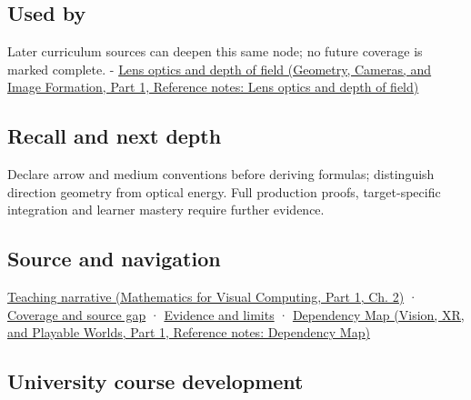 \subsection{Used by}\label{appendix-44e00863b4d5-used-by}

\hypertarget{appendix-44e00863b4d5-used-by}{}

Later curriculum sources can deepen this same node; no future coverage is marked complete. - \href{../03-Geometry-Cameras-and-Image-Formation-P01/main.pdf\#appendix-21f8456e2629}{Lens optics and depth of field (Geometry, Cameras, and Image Formation, Part 1, Reference notes: Lens optics and depth of field)}

\subsection{Recall and next depth}\label{appendix-44e00863b4d5-recall-and-next-depth}

\hypertarget{appendix-44e00863b4d5-recall-and-next-depth}{}

Declare arrow and medium conventions before deriving formulas; distinguish direction geometry from optical energy. Full production proofs, target-specific integration and learner mastery require further evidence.

\subsection{Source and navigation}\label{appendix-44e00863b4d5-source-and-navigation}

\hypertarget{appendix-44e00863b4d5-source-and-navigation}{}

\href{../02-Mathematics-for-Visual-Computing-P01/main.pdf\#01-foundations-i-ch018-light-uses-the-same-decomposition-in-a-new-role}{Teaching narrative (Mathematics for Visual Computing, Part 1, Ch. 2)} · \hyperref[appendix-fd090d982a15-phase-6---parts-501-600]{Coverage and source gap} · \hyperref[appendix-a103e7846d21-phase-6---source-analysis-and-verification]{Evidence and limits} · \href{../07-Vision-XR-and-Playable-Worlds-P01/main.pdf\#appendix-4ad47bdd269a}{Dependency Map (Vision, XR, and Playable Worlds, Part 1, Reference notes: Dependency Map)}

\subsection{University course development}\label{appendix-44e00863b4d5-university-course-development}

